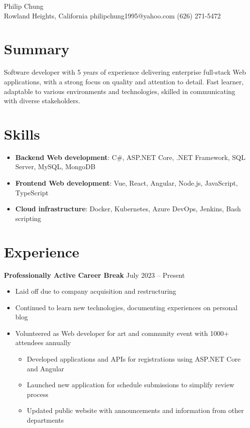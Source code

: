 \documentclass[12pt]{article}
\newcommand{\titleheader}[2]{\textbf{#1} \symbol{"B7} #2}
\begin{document}
	\begin{center}
		{\headerfont\fontsize{24pt}{24pt}\selectfont Philip Chung} \\ \vspace{0.5em}
		Rowland Heights, California  philipchung1995@yahoo.com  (626) 271-5472
	\end{center}

	\section*{Summary}

	Software developer with 5 years of experience delivering enterprise full-stack Web applications, with a strong focus on quality and attention to detail. Fast learner, adaptable to various environments and technologies, skilled in communicating with diverse stakeholders.

	\section*{Skills}

	\newcommand{\skillitem}[2]{\item \textbf{#1}: #2}

	\begin{itemize}[left=0.25in .. 0.25in,label={},itemindent=-0.25in]
		\skillitem{Backend Web development}{C\#, ASP.NET Core, .NET Framework, SQL Server, MySQL, MongoDB}
		\skillitem{Frontend Web development}{Vue, React, Angular, Node.js, JavaScript, TypeScript}
		\skillitem{Cloud infrastructure}{Docker, Kubernetes, Azure DevOps, Jenkins, Bash scripting}
	\end{itemize}

	\section*{Experience}

	\titleheader{Professionally Active Career Break}{July 2023 -- Present}

	\begin{itemize}
		\item Laid off due to company acquisition and restructuring
		\item Continued to learn new technologies, documenting experiences on personal blog
		\item Volunteered as Web developer for art and community event with 1000+ attendees annually
		\begin{itemize}
			\item Developed applications and APIs for registrations using ASP.NET Core and Angular
			\item Launched new application for schedule submissions to simplify review process
			\item Updated public website with announcements and information from other departments
		\end{itemize}
	\end{itemize}
\end{document}

